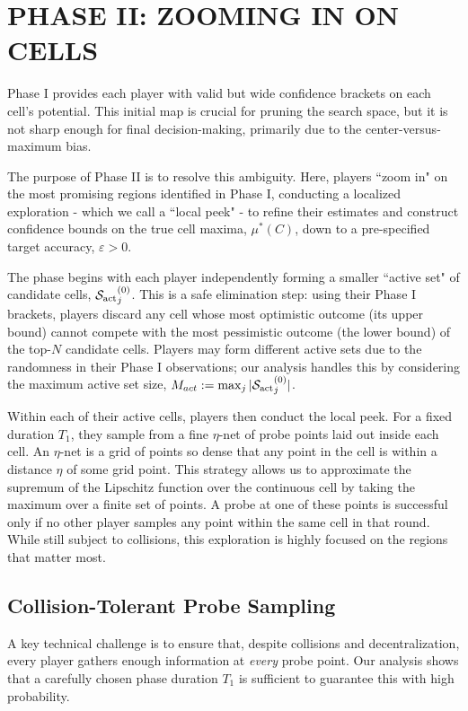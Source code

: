 \section{PHASE II: ZOOMING IN ON CELLS}
\label{sec:phase2}

Phase I provides each player with valid but wide confidence brackets on each cell's potential. This initial map is crucial for pruning the search space, but it is not sharp enough for final decision-making, primarily due to the center-versus-maximum bias. 

The purpose of Phase II is to resolve this ambiguity. Here, players ``zoom in" on the most promising regions identified in Phase I, conducting a localized exploration - which we call a ``local peek" - to refine their estimates and construct confidence bounds on the true cell maxima, $\mu^{\ast}(C)$, down to a pre-specified target accuracy, $\varepsilon > 0$.

The phase begins with each player independently forming a smaller ``active set" of candidate cells, ${\mathcal{S}_{\mathrm{act}}}^{(0)}_j$. This is a safe elimination step: using their Phase I brackets, players discard any cell whose most optimistic outcome (its upper bound) cannot compete with the most pessimistic outcome (the lower bound) of the top-$N$ candidate cells. Players may form different active sets due to the randomness in their Phase I observations; our analysis handles this by considering the maximum active set size, $M_{act}:=\max_j |{\mathcal{S}_{\mathrm{act}}}^{(0)}_j|$.

Within each of their active cells, players then conduct the local peek. For a fixed duration $T_1$, they sample from a fine $\eta$-net of probe points laid out inside each cell. An $\eta$-net is a grid of points so dense that any point in the cell is within a distance $\eta$ of some grid point. This strategy allows us to approximate the supremum of the Lipschitz function over the continuous cell by taking the maximum over a finite set of points. A probe at one of these points is successful only if no other player samples any point within the same cell in that round. While still subject to collisions, this exploration is highly focused on the regions that matter most.

\subsection{Collision-Tolerant Probe Sampling}
A key technical challenge is to ensure that, despite collisions and decentralization, every player gathers enough information at \emph{every} probe point. Our analysis shows that a carefully chosen phase duration $T_1$ is sufficient to guarantee this with high probability.

